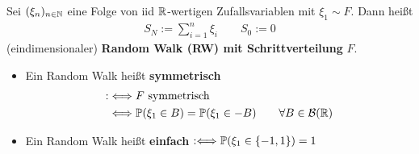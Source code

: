 \begin{defi}\enter %
Sei $(\xi_n)_{n\in\N}$ eine Folge von iid $\R$-wertigen Zufallsvariablen mit $\xi_1\sim F$. Dann heißt
\begin{align*}
S_N:=\sum\limits_{i=1}^n\xi_i\qquad S_0:=0
\end{align*}
(eindimensionaler) \textbf{Random Walk (RW) mit Schrittverteilung} $F$.
\begin{itemize}
\item Ein Random Walk heißt \textbf{symmetrisch}
\begin{align*}
:&\Longleftrightarrow F\text{ symmetrisch}\\
&\Longleftrightarrow\P(\xi_1\in B)=\P(\xi_1\in -B)\qquad\forall B\in\B(\R)
\end{align*}
\item Ein Random Walk heißt \textbf{einfach} 
$\begin{aligned}
	:\Longleftrightarrow\P(\xi_1\in\lbrace-1,1\rbrace)=1
\end{aligned}$
\end{itemize}
\end{defi}

